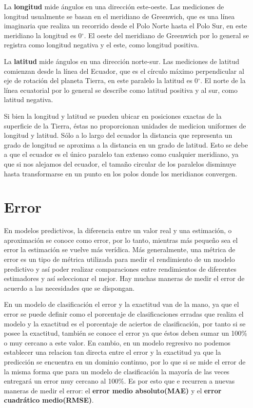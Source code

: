     La \textbf{longitud} mide ángulos en una dirección este-oeste. Las mediciones de longitud usualmente se basan en el meridiano de Greenwich, que es una línea
    imaginaria que realiza un recorrido desde el Polo Norte hasta el Polo Sur, en este meridiano la longitud es 0$^{\circ}$. El oeste del meridiano de Greenwich por lo general 
    se registra como longitud negativa y el este, como longitud positiva.

    La \textbf{latitud} mide ángulos en una dirección norte-sur. Las mediciones de latitud comienzan desde la línea del Ecuador, que es el círculo máximo perpendicular
    al eje de rotación del planeta Tierra, en este paralelo la latitud es 0$^{\circ}$. El norte de la línea ecuatorial por lo general 
    se describe como latitud positiva y al sur, como latitud negativa.

    Si bien la longitud y latitud se pueden ubicar en posiciones exactas de la superficie de la Tierra, éstas no proporcionan
    unidades de medicion uniformes de longitud y latitud. Sólo a lo largo del ecuador la distancia que representa un grado de longitud se aproxima a la distancia
    en un grado de latitud. Esto se debe a que el ecuador es el único paralelo tan extenso como cualquier meridiano, ya que si nos alejamos del ecuador, el tamaño circular de
    los paralelos disminuye hasta transformarse en un punto en los polos donde los meridianos convergen.
%    
%
%
%
\section{Error}
En modelos predictivos, la diferencia entre un valor real y una estimación, o aproximación se conoce como error, por lo tanto, mientras más pequeño sea el error
la estimación se vuelve más verídica. Más generalmente, una métrica de error es un tipo de métrica utilizada para medir el rendimiento de un modelo predictivo y así poder
realizar comparaciones entre rendimientos de diferentes estimadores y así seleccionar el mejor.
Hay muchas maneras de medir el error de acuerdo a las necesidades que se dispongan.


En un modelo de clasificación el error y la exactitud van de la mano, ya que el error se puede definir como el porcentaje de clasificaciones erradas que realiza el modelo 
y la exactitud es el porcentaje de aciertos de clasificación, por tanto si se posee la exactitud, también se conoce el error ya que éstos deben sumar un 100\% o muy cercano a este valor.
En cambio, en un modelo regresivo no podemos establecer una relacion tan directa entre el error y la exactitud ya que la predicción se encuentra en un dominio continuo, por lo que si se mide el 
error de la misma forma que para un modelo de clasificación la mayoría de las veces entregará un error muy cercano al 100\%. Es por esto que e recurren a nuevas maneras de medir el error: 
el \textbf{error medio absoluto(MAE)} y el \textbf{error cuadrático medio(RMSE)}.

